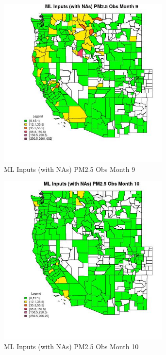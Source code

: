 \begin{figure} 
\centering  
\includegraphics[width=0.77\textwidth]{Code_Outputs/Report_ML_input_PM25_Step4_part_e_de_duplicated_aves_compiled_2019-05-20wNAs_CountyPM25_ObsmedianMonth9.jpg} 
\caption{\label{fig:Report_ML_input_PM25_Step4_part_e_de_duplicated_aves_compiled_2019-05-20wNAsCountyPM25_ObsmedianMonth9}ML Inputs (with NAs) PM2.5 Obs Month 9} 
\end{figure} 
 

\begin{figure} 
\centering  
\includegraphics[width=0.77\textwidth]{Code_Outputs/Report_ML_input_PM25_Step4_part_e_de_duplicated_aves_compiled_2019-05-20wNAs_CountyPM25_ObsmedianMonth10.jpg} 
\caption{\label{fig:Report_ML_input_PM25_Step4_part_e_de_duplicated_aves_compiled_2019-05-20wNAsCountyPM25_ObsmedianMonth10}ML Inputs (with NAs) PM2.5 Obs Month 10} 
\end{figure} 
 

